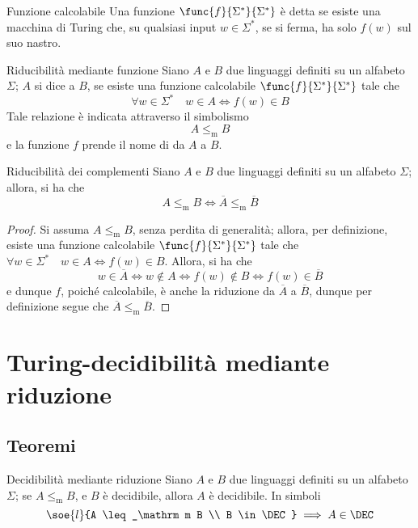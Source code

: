 \documentclass[a4paper, 12pt]{report}
\begin{document}
    \begin{frameddefn}{Funzione calcolabile}
        Una funzione $\func{f}{\Sigma^*}{\Sigma^*}$ è detta  se esiste una macchina di Turing che, su qualsiasi input $w \in \Sigma^*$, se si ferma, ha solo $f(w)$ sul suo nastro.
    \end{frameddefn}

    \begin{frameddefn}{Riducibilità mediante funzione}
        Siano $A$ e $B$ due linguaggi definiti su un alfabeto $\Sigma$; $A$ si dice  a $B$, se esiste una funzione calcolabile $\func{f}{\Sigma^*}{\Sigma^*}$ tale che $$\forall w \in \Sigma^* \quad w \in A \iff f(w) \in B$$ Tale relazione è indicata attraverso il simbolismo $$A \leq_\mathrm m B$$ e la funzione $f$ prende il nome di  da $A$ a $B$.
    \end{frameddefn}
    
    \begin{framedlem}[label={red compl}]{Riducibilità dei complementi}
        Siano $A$ e $B$ due linguaggi definiti su un alfabeto $\Sigma$; allora, si ha che $$A \leq_\mathrm m B \iff \overline A \leq_\mathrm m \overline B$$
    \end{framedlem}

    \begin{proof}
        Si assuma $A \leq_\mathrm m B$, senza perdita di generalità; allora, per definizione, esiste una funzione calcolabile $\func{f}{\Sigma^*}{\Sigma^*}$ tale che $\forall w \in \Sigma ^* \quad w \in A \iff f(w) \in B$. Allora, si ha che $$w \in \overline A \iff w \notin A \iff f(w) \notin B \iff f(w) \in \overline B$$ e dunque $f$, poiché calcolabile, è anche la riduzione da $\overline A$ a $\overline B$, dunque per definizione segue che $\overline A \leq_\mathrm m \overline B$.
    \end{proof}

    \section{Turing-decidibilità mediante riduzione}

    \subsection{Teoremi}

    \begin{framedthm}[label={dec w red}]{Decidibilità mediante riduzione}
        Siano $A$ e $B$ due linguaggi definiti su un alfabeto $\Sigma$; se $A \leq_\mathrm m B$, e $B$ è decidibile, allora $A$ è decidibile. In simboli $$\soe{l}{A \leq_\mathrm m B \\ B \in \DEC} \implies A \in \DEC$$
    \end{framedthm}
\end{document}
